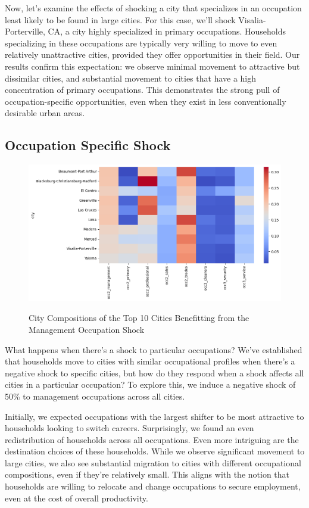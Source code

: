 \documentclass[10pt]{article}
\begin{document}
Now, let's examine the effects of shocking a city that specializes in an occupation least likely to be found in large cities. For this case, we'll shock Visalia-Porterville, CA, a city highly specialized in primary occupations. Households specializing in these occupations are typically very willing to move to even relatively unattractive cities, provided they offer opportunities in their field. Our results confirm this expectation: we observe minimal movement to attractive but dissimilar cities, and substantial movement to cities that have a high concentration of primary occupations. This demonstrates the strong pull of occupation-specific opportunities, even when they exist in less conventionally desirable urban areas.

\subsection{Occupation Specific Shock}

\begin{figure}[!htb]
    \centering
    \caption{City Compositions of the Top 10 Cities Benefitting from the Management Occupation Shock}
    \includegraphics[width=\textwidth]{../../estimations/graphs/man_counter.png}
    \label{man_change_graph}
\end{figure}

What happens when there's a shock to particular occupations? We've established that households move to cities with similar occupational profiles when there's a negative shock to specific cities, but how do they respond when a shock affects all cities in a particular occupation? To explore this, we induce a negative shock of 50\% to management occupations across all cities.

Initially, we expected occupations with the largest shifter to be most attractive to households looking to switch careers. Surprisingly, we found an even redistribution of households across all occupations. Even more intriguing are the destination choices of these households. While we observe significant movement to large cities, we also see substantial migration to cities with different occupational compositions, even if they're relatively small. This aligns with the notion that households are willing to relocate and change occupations to secure employment, even at the cost of overall productivity.
\end{document}
